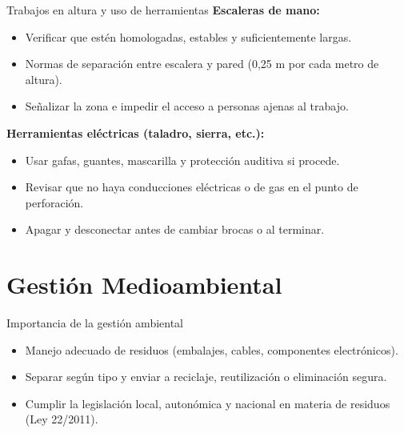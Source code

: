 \documentclass{beamer}
\begin{document}
\begin{frame}{Trabajos en altura y uso de herramientas}
    \textbf{Escaleras de mano:}
    \begin{itemize}
        \item Verificar que estén homologadas, estables y suficientemente largas.
        \item Normas de separación entre escalera y pared (0,25 m por cada metro de altura).
        \item Señalizar la zona e impedir el acceso a personas ajenas al trabajo.
    \end{itemize}
    \vspace{1em}
    \textbf{Herramientas eléctricas (taladro, sierra, etc.):}
    \begin{itemize}
        \item Usar gafas, guantes, mascarilla y protección auditiva si procede.
        \item Revisar que no haya conducciones eléctricas o de gas en el punto de perforación.
        \item Apagar y desconectar antes de cambiar brocas o al terminar.
    \end{itemize}
\end{frame}

\section{Gestión Medioambiental}

\begin{frame}{Importancia de la gestión ambiental}
    \begin{itemize}
        \item Manejo adecuado de residuos (embalajes, cables, componentes electrónicos).
        \item Separar según tipo y enviar a reciclaje, reutilización o eliminación segura.
        \item Cumplir la legislación local, autonómica y nacional en materia de residuos (Ley 22/2011).
    \end{itemize}
\end{frame}
\end{document}
